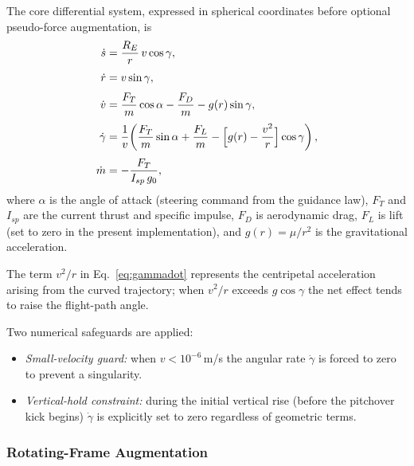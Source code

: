 The core differential system, expressed in spherical coordinates before
optional pseudo-force augmentation, is
\begin{align}
  \dot s      &= \frac{R_E}{r}\,v\cos\gamma,
               \label{eq:sdot}\\[3pt]
  \dot r      &= v\sin\gamma,
               \label{eq:rdot}\\[3pt]
  \dot v      &= \frac{F_T}{m}\cos\alpha
                 - \frac{F_D}{m}
                 - g(r)\sin\gamma,
               \label{eq:vdot}\\[3pt]
  \dot\gamma  &= \frac{1}{v}\!\left(
                   \frac{F_T}{m}\sin\alpha
                   + \frac{F_L}{m}
                   - \Bigl[g(r) - \frac{v^2}{r}\Bigr]\cos\gamma
                 \right),
               \label{eq:gammadot}\\[3pt]
  \dot m      &= -\frac{F_T}{I_{sp}\,g_0},
               \label{eq:mdot}
\end{align}
where $\alpha$ is the angle of attack (steering command from the guidance law),
$F_T$ and $I_{sp}$ are the current thrust and specific impulse, $F_D$ is
aerodynamic drag, $F_L$ is lift (set to zero in the present implementation),
and $g(r) = \mu/r^2$ is the gravitational acceleration.

The term $v^2/r$ in Eq.~\eqref{eq:gammadot} represents the centripetal
acceleration arising from the curved trajectory; when $v^2/r$ exceeds
$g\cos\gamma$ the net effect tends to raise the flight-path angle.

Two numerical safeguards are applied:
\begin{itemize}
  \item \emph{Small-velocity guard:} when $v < 10^{-6}$\,m/s the angular rate
        $\dot\gamma$ is forced to zero to prevent a singularity.
  \item \emph{Vertical-hold constraint:} during the initial vertical rise
        (before the pitchover kick begins) $\dot\gamma$ is explicitly set to
        zero regardless of geometric terms.
\end{itemize}

\subsubsection{Rotating-Frame Augmentation}

